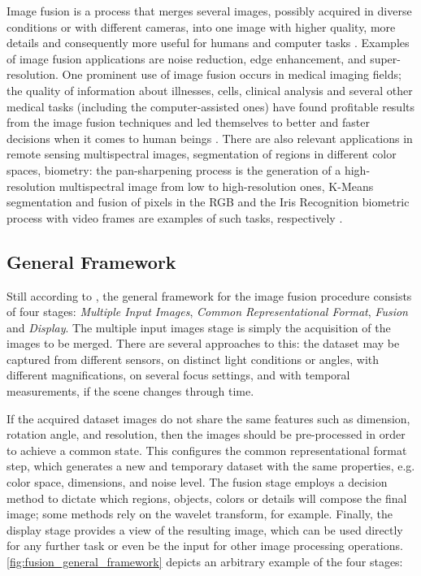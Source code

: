 Image fusion is a process that merges several images, possibly acquired in diverse conditions or with different cameras, into one image with higher quality, more details and consequently more useful for humans and computer tasks \cite{mitchell2010image}. Examples of image fusion applications are noise reduction, edge enhancement, and super-resolution. One prominent use of image fusion occurs in medical imaging fields; the quality of information about illnesses, cells, clinical analysis and several other medical tasks (including the computer-assisted ones) have found profitable results from the image fusion techniques and led themselves to better and faster decisions when it comes to human beings \cite{james2014medical}. There are also relevant applications in remote sensing multispectral images, segmentation of regions in different color spaces, biometry: the pan-sharpening process is the generation of a high-resolution multispectral image from low to high-resolution ones, K-Means segmentation and fusion of pixels in the RGB and the Iris Recognition biometric process with video frames are examples of such tasks, respectively \cite{mitchell2010image}.

\subsection{General Framework}

Still according to , the general framework for the image fusion procedure consists of four stages: \emph{Multiple Input Images}, \emph{Common Representational Format}, \emph{Fusion} and \emph{Display}.
The multiple input images stage is simply the acquisition of the images to be merged. There are several approaches to this: the dataset may be captured from different sensors, on distinct light conditions or angles, with different magnifications, on several focus settings, and with temporal measurements, if the scene changes through time.

If the acquired dataset images do not share the same features such as dimension, rotation angle, and resolution, then the images should be pre-processed in order to achieve a common state. This configures the common representational format step, which generates a new and temporary dataset with the same properties, e.g. color space, dimensions, and noise level. The fusion stage employs a decision method to dictate which regions, objects, colors or details will compose the final image; some methods rely on the wavelet transform, for example. Finally, the display stage provides a view of the resulting image, which can be used directly for any further task or even be the input for other image processing operations. \autoref{fig:fusion_general_framework} depicts an arbitrary example of the four stages:

